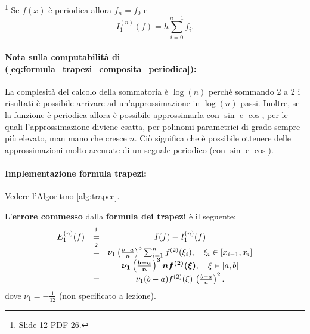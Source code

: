 \begin{remark}
    \footnote{Slide 12 PDF 26.} Se $f(x)$ è periodica allora $f_n=f_0$ e
    \begin{equation}\label{eq:formula_trapezi_composita_periodica}
    	I_1^{(n)}(f)=h \sum_{i=0}^{n-1}f_i.
    \end{equation}
\end{remark}

\paragraph{Nota sulla computabilità di (\ref{eq:formula_trapezi_composita_periodica}):} La complesità del calcolo della sommatoria è $\log (n)$ perché sommando 2 a 2 i risultati è possibile arrivare ad un'approssimazione in $\log (n)$ passi. Inoltre, se la funzione è periodica allora è possibile approssimarla con $\sin$ e $\cos$, per le quali l'approssimazione diviene esatta, per polinomi parametrici di grado sempre più elevato, man mano che cresce $n$. Ciò significa che è possibile ottenere delle approssimazioni molto accurate di un segnale periodico (con $\sin$ e $\cos$).

\paragraph{Implementazione formula trapezi:} Vedere l'Algoritmo \ref{alg:trapec}.

\begin{definition}
    L'\textbf{errore commesso} dalla \textbf{formula dei trapezi} è il seguente:
    \begin{equation}\label{eq:errore_formula_trapezi_composita}
        \begin{matrix}
            E_1^{(n)}(f) &\overset{\footnotemark}{=}& I(f)-I_1^{(n)}(f)\\
            &\overset{\footnotemark}{=}&\nu_1 \left(\frac{b-a}{n}\right)^3 \sum_{i=1}^n f^{(2)}(\xi_i),\quad \xi_i\in[x_{i-1},x_i]\\
            &=&\boldsymbol{\nu_1 \left(\frac{b-a}{n}\right)^{3} n  f^{(2)}(\xi)},\quad \xi\in[a,b] \\
            &=& \nu_1 (b-a)f^{(2)}(\xi)\,\left(\frac{b-a}{n}\right)^2.
        \end{matrix}
    \end{equation}
    dove $\nu_1=-\frac{1}{12}$ (non specificato a lezione).
\end{definition}

